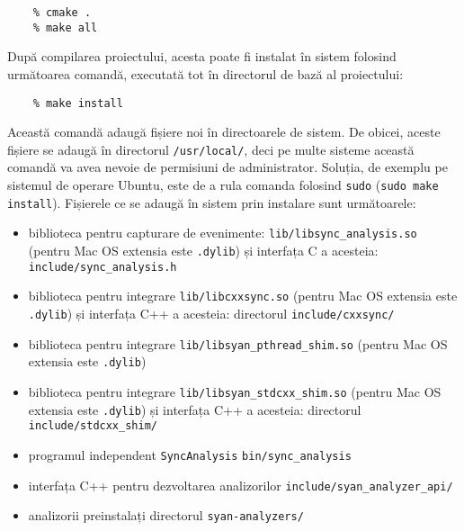 \begin{lstlisting}
    % cmake .
    % make all
\end{lstlisting}

După compilarea proiectului, acesta poate fi instalat în sistem folosind
următoarea comandă, executată tot în directorul de bază al proiectului:

\begin{lstlisting}
    % make install
\end{lstlisting}

Această comandă adaugă fișiere noi în directoarele de sistem. De obicei,
aceste fișiere se adaugă în directorul \lstinline{/usr/local/}, deci pe
multe sisteme această comandă va avea nevoie de permisiuni de
administrator. Soluția, de exemplu pe sistemul de operare Ubuntu, este
de a rula comanda folosind \lstinline{sudo}
(\lstinline{sudo make install}). Fișierele ce se adaugă în sistem prin
instalare sunt următoarele:

\begin{itemize}
    \item biblioteca pentru capturare de evenimente:
    \lstinline{lib/libsync_analysis.so} (pentru Mac OS extensia este
    \lstinline{.dylib}) și interfața C a acesteia:
    \lstinline{include/sync_analysis.h}
    \item biblioteca pentru integrare \lstinline{lib/libcxxsync.so}
    (pentru Mac OS extensia este \lstinline{.dylib}) și interfața C++ a
    acesteia: directorul \lstinline{include/cxxsync/}
    \item biblioteca pentru integrare
    \lstinline{lib/libsyan_pthread_shim.so} (pentru Mac OS extensia este
    \lstinline{.dylib})
    \item biblioteca pentru integrare
    \lstinline{lib/libsyan_stdcxx_shim.so} (pentru Mac OS extensia
    este \lstinline{.dylib}) și interfața C++ a acesteia: directorul
    \lstinline{include/stdcxx_shim/}
    \item programul independent \lstinline{SyncAnalysis}
    \lstinline{bin/sync_analysis}
    \item interfața C++ pentru dezvoltarea analizorilor
    \lstinline{include/syan_analyzer_api/}
    \item analizorii preinstalați directorul \lstinline{syan-analyzers/}
\end{itemize}
